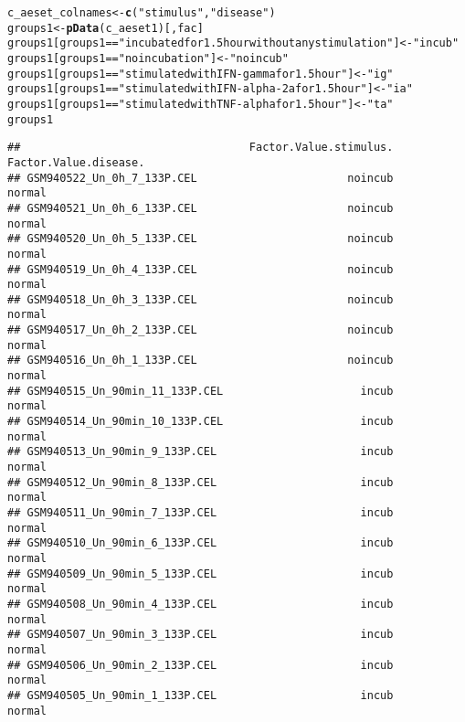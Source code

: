 \documentclass{article}
\makeatletter
\newcommand{\hlstr}[1]{\textcolor[rgb]{0.192,0.494,0.8}{#1}}%
\newcommand{\hlopt}[1]{\textcolor[rgb]{0,0,0}{#1}}%
\newcommand{\hlstd}[1]{\textcolor[rgb]{0.345,0.345,0.345}{#1}}%
\newcommand{\hlkwb}[1]{\textcolor[rgb]{0.69,0.353,0.396}{#1}}%
\newcommand{\hlkwd}[1]{\textcolor[rgb]{0.737,0.353,0.396}{\textbf{#1}}}%
\newenvironment{kframe}{%
 \def\at@end@of@kframe{}%
 \ifinner\ifhmode%
  \def\at@end@of@kframe{\end{minipage}}%
  \begin{minipage}{\columnwidth}%
 \fi\fi%
 \def\FrameCommand##1{\hskip\@totalleftmargin \hskip-\fboxsep
 \colorbox{shadecolor}{##1}\hskip-\fboxsep
     \hskip-\linewidth \hskip-\@totalleftmargin \hskip\columnwidth}%
 \MakeFramed {\advance\hsize-\width
   \@totalleftmargin\z@ \linewidth\hsize
   \@setminipage}}%
 {\par\unskip\endMakeFramed%
 \at@end@of@kframe}
\newenvironment{knitrout}{}{} %
\makeatother
\begin{document}
\begin{knitrout}
\color{fgcolor}\begin{kframe}
\begin{alltt}
\hlstd{c_aeset_colnames} \hlkwb{<-} \hlkwd{c}\hlstd{(}\hlstr{"stimulus"}\hlstd{,} \hlstr{"disease"}\hlstd{)}
\hlstd{groups1} \hlkwb{<-} \hlkwd{pData}\hlstd{(c_aeset1)[, fac]}
\hlstd{groups1[groups1} \hlopt{==} \hlstr{"incubated for 1.5 hour without any stimulation"}\hlstd{]} \hlkwb{<-} \hlstr{"incub"}
\hlstd{groups1[groups1} \hlopt{==} \hlstr{"no incubation"}\hlstd{]} \hlkwb{<-} \hlstr{"noincub"}
\hlstd{groups1[groups1} \hlopt{==} \hlstr{"stimulated with IFN-gamma for 1.5 hour"}\hlstd{]} \hlkwb{<-} \hlstr{"ig"}
\hlstd{groups1[groups1} \hlopt{==} \hlstr{"stimulated with IFN-alpha-2a for 1.5 hour"}\hlstd{]} \hlkwb{<-} \hlstr{"ia"}
\hlstd{groups1[groups1} \hlopt{==} \hlstr{"stimulated with TNF-alpha for 1.5 hour"}\hlstd{]} \hlkwb{<-} \hlstr{"ta"}
\hlstd{groups1}
\end{alltt}
\begin{verbatim}
##                                   Factor.Value.stimulus. Factor.Value.disease.
## GSM940522_Un_0h_7_133P.CEL                       noincub                normal
## GSM940521_Un_0h_6_133P.CEL                       noincub                normal
## GSM940520_Un_0h_5_133P.CEL                       noincub                normal
## GSM940519_Un_0h_4_133P.CEL                       noincub                normal
## GSM940518_Un_0h_3_133P.CEL                       noincub                normal
## GSM940517_Un_0h_2_133P.CEL                       noincub                normal
## GSM940516_Un_0h_1_133P.CEL                       noincub                normal
## GSM940515_Un_90min_11_133P.CEL                     incub                normal
## GSM940514_Un_90min_10_133P.CEL                     incub                normal
## GSM940513_Un_90min_9_133P.CEL                      incub                normal
## GSM940512_Un_90min_8_133P.CEL                      incub                normal
## GSM940511_Un_90min_7_133P.CEL                      incub                normal
## GSM940510_Un_90min_6_133P.CEL                      incub                normal
## GSM940509_Un_90min_5_133P.CEL                      incub                normal
## GSM940508_Un_90min_4_133P.CEL                      incub                normal
## GSM940507_Un_90min_3_133P.CEL                      incub                normal
## GSM940506_Un_90min_2_133P.CEL                      incub                normal
## GSM940505_Un_90min_1_133P.CEL                      incub                normal

\end{verbatim}
\end{kframe}
\end{knitrout}
\end{document}
